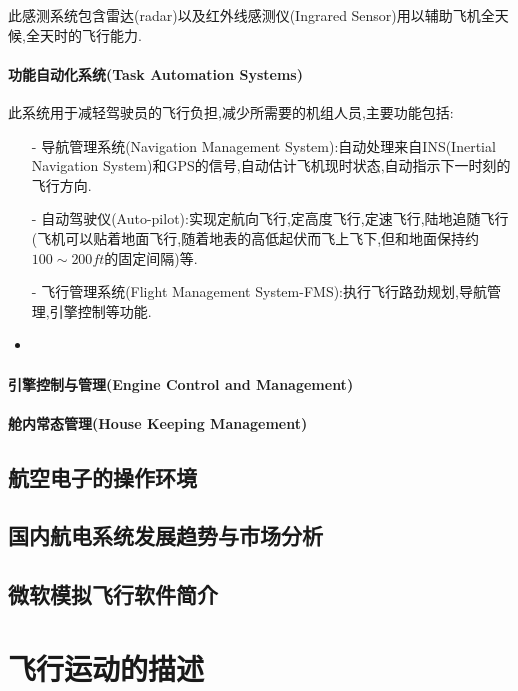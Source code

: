 \documentclass[9pt, oneside]{book}
\begin{document}
此感测系统包含雷达(radar)以及红外线感测仪(Ingrared Sensor)用以辅助飞机全天候,全天时的飞行能力.

\subsubsection{功能自动化系统(Task Automation Systems)}

此系统用于减轻驾驶员的飞行负担,减少所需要的机组人员,主要功能包括:

\begin{itemize}
    \item [-] 导航管理系统(Navigation Management System):自动处理来自INS(Inertial Navigation System)和GPS的信号,自动估计飞机现时状态,自动指示下一时刻的飞行方向.
    \item [-] 自动驾驶仪(Auto-pilot):实现定航向飞行,定高度飞行,定速飞行,陆地追随飞行(飞机可以贴着地面飞行,随着地表的高低起伏而飞上飞下,但和地面保持约$100\sim 200ft$的固定间隔)等.
    \item [-] 飞行管理系统(Flight Management System-FMS):执行飞行路劲规划,导航管理,引擎控制等功能.
    \item 
\end{itemize}

\subsubsection{引擎控制与管理(Engine Control and Management)}

\subsubsection{舱内常态管理(House Keeping Management)}

\section{航空电子的操作环境}

\section{国内航电系统发展趋势与市场分析}

\section{微软模拟飞行软件简介}


\chapter{飞行运动的描述}
\end{document}
